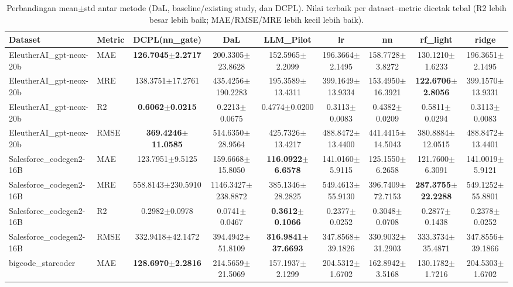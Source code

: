 \begin{table}[t]
\centering
\small
\caption{Perbandingan mean$\pm$std antar metode (DaL, baseline/existing study, dan DCPL). Nilai terbaik per dataset--metric dicetak tebal (R2 lebih besar lebih baik; MAE/RMSE/MRE lebih kecil lebih baik).}
\label{tab:compare_means_all}
\begin{tabular}{llccccccc}
\toprule
Dataset & Metric & DCPL(nn\_gate) & DaL & LLM\_Pilot & lr & nn & rf\_light & ridge \\
\midrule
EleutherAI\_gpt-neox-20b & MAE & \textbf{126.7045$\pm$2.2717} & 200.3305$\pm$23.8628 & 152.5965$\pm$2.2099 & 196.3664$\pm$2.1495 & 158.7728$\pm$3.8272 & 130.1210$\pm$1.6233 & 196.3651$\pm$2.1495 \\
EleutherAI\_gpt-neox-20b & MRE & 138.3751$\pm$17.2761 & 435.4256$\pm$190.2283 & 195.3589$\pm$13.4311 & 399.1649$\pm$13.9334 & 153.4950$\pm$16.3921 & \textbf{122.6706$\pm$2.8056} & 399.1570$\pm$13.9331 \\
EleutherAI\_gpt-neox-20b & R2 & \textbf{0.6062$\pm$0.0215} & 0.2213$\pm$0.0675 & 0.4774$\pm$0.0200 & 0.3113$\pm$0.0083 & 0.4382$\pm$0.0209 & 0.5811$\pm$0.0294 & 0.3113$\pm$0.0083 \\
EleutherAI\_gpt-neox-20b & RMSE & \textbf{369.4246$\pm$11.0585} & 514.6350$\pm$28.9564 & 425.7326$\pm$13.4217 & 488.8472$\pm$13.4400 & 441.4415$\pm$14.5043 & 380.8884$\pm$12.0515 & 488.8472$\pm$13.4401 \\
\addlinespace
Salesforce\_codegen2-16B & MAE & 123.7951$\pm$9.5125 & 159.6668$\pm$15.8050 & \textbf{116.0922$\pm$6.6578} & 141.0160$\pm$5.9115 & 125.1550$\pm$6.2658 & 121.7600$\pm$6.3091 & 141.0019$\pm$5.9121 \\
Salesforce\_codegen2-16B & MRE & 558.8143$\pm$230.5910 & 1146.3427$\pm$238.8872 & 385.1346$\pm$28.2825 & 549.4613$\pm$55.9130 & 396.7409$\pm$72.7153 & \textbf{287.3755$\pm$22.2288} & 549.1252$\pm$55.8801 \\
Salesforce\_codegen2-16B & R2 & 0.2982$\pm$0.0978 & 0.0741$\pm$0.0467 & \textbf{0.3612$\pm$0.1066} & 0.2377$\pm$0.0252 & 0.3048$\pm$0.0708 & 0.2877$\pm$0.1438 & 0.2378$\pm$0.0252 \\
Salesforce\_codegen2-16B & RMSE & 332.9418$\pm$42.1472 & 394.4942$\pm$51.8109 & \textbf{316.9841$\pm$37.6693} & 347.8568$\pm$39.1826 & 330.9032$\pm$31.2903 & 333.3734$\pm$35.4871 & 347.8556$\pm$39.1866 \\
\addlinespace
bigcode\_starcoder & MAE & \textbf{128.6970$\pm$2.2816} & 214.5659$\pm$21.5069 & 157.1937$\pm$2.1299 & 204.5312$\pm$1.6702 & 162.8942$\pm$3.5168 & 130.1782$\pm$1.7216 & 204.5303$\pm$1.6702 \\

\end{tabular}
\end{table}
